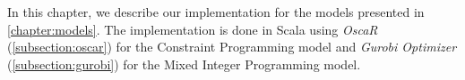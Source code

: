 \documentclass[../thesis.tex]{subfiles}
\begin{document}
In this chapter, we describe our implementation for the models presented in \autoref{chapter:models}.
The implementation is done in Scala using 
\emph{OscaR} (\ref{subsection:oscar}) for the Constraint Programming model and
\emph{Gurobi Optimizer} (\ref{subsection:gurobi}) for the Mixed Integer Programming model.
\end{document}
